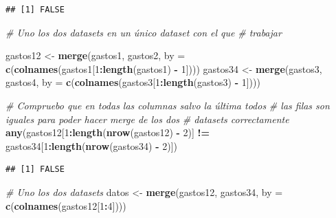 \documentclass[data,article,submit,moreauthors,pdftex]{Definitions/mdpi}
\newenvironment{Shaded}{\begin{snugshade}}{\end{snugshade}}
\newcommand{\AttributeTok}[1]{\textcolor[rgb]{0.13,0.29,0.53}{#1}}
\newcommand{\CommentTok}[1]{\textcolor[rgb]{0.56,0.35,0.01}{\textit{#1}}}
\newcommand{\DecValTok}[1]{\textcolor[rgb]{0.00,0.00,0.81}{#1}}
\newcommand{\FunctionTok}[1]{\textcolor[rgb]{0.13,0.29,0.53}{\textbf{#1}}}
\newcommand{\NormalTok}[1]{#1}
\newcommand{\OtherTok}[1]{\textcolor[rgb]{0.56,0.35,0.01}{#1}}
\newcommand{\SpecialCharTok}[1]{\textcolor[rgb]{0.81,0.36,0.00}{\textbf{#1}}}
\begin{document}
\begin{verbatim}
## [1] FALSE
\end{verbatim}

\begin{Shaded}
\begin{Highlighting}[]
\CommentTok{\# Uno los dos datasets en un único dataset con el que}
\CommentTok{\# trabajar}

\NormalTok{gastos12 }\OtherTok{\textless{}{-}} \FunctionTok{merge}\NormalTok{(gastos1, gastos2, }\AttributeTok{by =} \FunctionTok{c}\NormalTok{(}\FunctionTok{colnames}\NormalTok{(gastos1[}\DecValTok{1}\SpecialCharTok{:}\FunctionTok{length}\NormalTok{(gastos1) }\SpecialCharTok{{-}}
    \DecValTok{1}\NormalTok{])))}
\NormalTok{gastos34 }\OtherTok{\textless{}{-}} \FunctionTok{merge}\NormalTok{(gastos3, gastos4, }\AttributeTok{by =} \FunctionTok{c}\NormalTok{(}\FunctionTok{colnames}\NormalTok{(gastos3[}\DecValTok{1}\SpecialCharTok{:}\FunctionTok{length}\NormalTok{(gastos3) }\SpecialCharTok{{-}}
    \DecValTok{1}\NormalTok{])))}
\end{Highlighting}
\end{Shaded}

\begin{Shaded}
\begin{Highlighting}[]
\CommentTok{\# Compruebo que en todas las columnas salvo la última todos}
\CommentTok{\# las filas son iguales para poder hacer merge de los dos}
\CommentTok{\# datasets correctamente}
\FunctionTok{any}\NormalTok{(gastos12[}\DecValTok{1}\SpecialCharTok{:}\FunctionTok{length}\NormalTok{(}\FunctionTok{nrow}\NormalTok{(gastos12) }\SpecialCharTok{{-}} \DecValTok{2}\NormalTok{)] }\SpecialCharTok{!=}\NormalTok{ gastos34[}\DecValTok{1}\SpecialCharTok{:}\FunctionTok{length}\NormalTok{(}\FunctionTok{nrow}\NormalTok{(gastos34) }\SpecialCharTok{{-}}
    \DecValTok{2}\NormalTok{)])}
\end{Highlighting}
\end{Shaded}

\begin{verbatim}
## [1] FALSE
\end{verbatim}

\begin{Shaded}
\begin{Highlighting}[]
\CommentTok{\# Uno los dos datasets}
\NormalTok{datos }\OtherTok{\textless{}{-}} \FunctionTok{merge}\NormalTok{(gastos12, gastos34, }\AttributeTok{by =} \FunctionTok{c}\NormalTok{(}\FunctionTok{colnames}\NormalTok{(gastos12[}\DecValTok{1}\SpecialCharTok{:}\DecValTok{4}\NormalTok{])))}
\end{Highlighting}
\end{Shaded}
\end{document}
